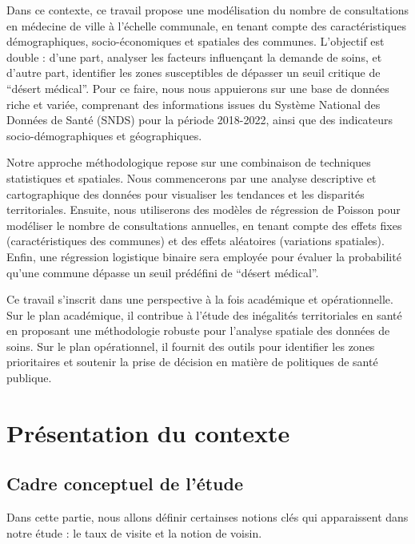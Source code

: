 \documentclass[
]{article}
\begin{document}
Dans ce contexte, ce travail propose une modélisation du nombre de
consultations en médecine de ville à l'échelle communale, en tenant
compte des caractéristiques démographiques, socio-économiques et
spatiales des communes. L'objectif est double : d'une part, analyser les
facteurs influençant la demande de soins, et d'autre part, identifier
les zones susceptibles de dépasser un seuil critique de ``désert
médical''. Pour ce faire, nous nous appuierons sur une base de données
riche et variée, comprenant des informations issues du Système National
des Données de Santé (SNDS) pour la période 2018-2022, ainsi que des
indicateurs socio-démographiques et géographiques.

Notre approche méthodologique repose sur une combinaison de techniques
statistiques et spatiales. Nous commencerons par une analyse descriptive
et cartographique des données pour visualiser les tendances et les
disparités territoriales. Ensuite, nous utiliserons des modèles de
régression de Poisson pour modéliser le nombre de consultations
annuelles, en tenant compte des effets fixes (caractéristiques des
communes) et des effets aléatoires (variations spatiales). Enfin, une
régression logistique binaire sera employée pour évaluer la probabilité
qu'une commune dépasse un seuil prédéfini de ``désert médical''.

Ce travail s'inscrit dans une perspective à la fois académique et
opérationnelle. Sur le plan académique, il contribue à l'étude des
inégalités territoriales en santé en proposant une méthodologie robuste
pour l'analyse spatiale des données de soins. Sur le plan opérationnel,
il fournit des outils pour identifier les zones prioritaires et soutenir
la prise de décision en matière de politiques de santé publique.

\hypertarget{pruxe9sentation-du-contexte}{%
\section{Présentation du contexte}\label{pruxe9sentation-du-contexte}}

\hypertarget{cadre-conceptuel-de-luxe9tude}{%
\subsection{Cadre conceptuel de
l'étude}\label{cadre-conceptuel-de-luxe9tude}}

Dans cette partie, nous allons définir certainses notions clés qui
apparaissent dans notre étude : le taux de visite et la notion de
voisin.
\end{document}

